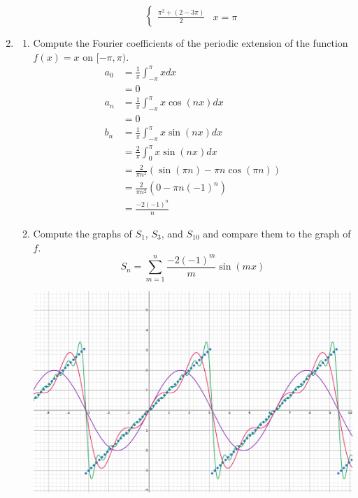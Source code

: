 \documentclass{article}
\begin{document}
\begin{enumerate}
\begin{enumerate}
\[\begin{cases}
                                    \frac{\pi^2+(2-3\pi)}{2} & x = \pi
                              \end{cases}
                        \]
            \end{enumerate}
            \setcounter{enumi}{4}
      \item \begin{enumerate}
                  \item Compute the Fourier coefficients of the periodic extension
                        of the function $f(x)=x$ on $[-\pi,\pi)$.
                        \begin{align*}
                              a_0 & = \frac{1}{\pi}\int_{-\pi}^\pi xdx                  \\
                                  & = 0                                                 \\
                              a_n & = \frac{1}{\pi}\int_{-\pi}^\pi x\cos(nx)dx          \\
                                  & = 0                                                 \\
                              b_n & = \frac{1}{\pi}\int_{-\pi}^\pi x\sin(nx)dx          \\
                                  & = \frac{2}{\pi}\int_0^\pi x\sin(nx)dx               \\
                                  & = \frac{2}{\pi n^2}(\sin(\pi n) - \pi n\cos(\pi n)) \\
                                  & = \frac{2}{\pi n^2}(0 - \pi n(-1)^n)                \\
                                  & = \frac{-2(-1)^n}{n}
                        \end{align*}
                  \item Compute the graphs of $S_1$, $S_3$, and $S_{10}$ and compare
                        them to the graph of $f$.
                        \[
                              S_n = \sum_{m=1}^n\frac{-2(-1)^m}{m}\sin(mx)
                        \]

                        \includegraphics[width=\linewidth]{fourier_x.png}


\end{enumerate}
\end{enumerate}
\end{document}

